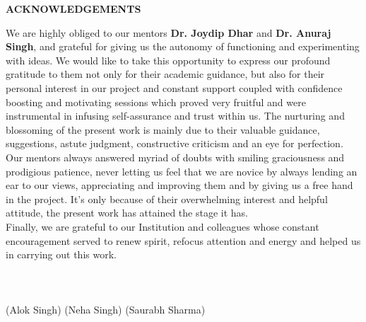 
\newpage
\begin{center}
{\large \bf ACKNOWLEDGEMENTS}
\end{center}
We are highly obliged to our mentors \textbf{Dr. Joydip Dhar} and \textbf{Dr. Anuraj Singh}, and grateful for giving us the autonomy of functioning and experimenting with ideas. We would like to take this opportunity to express our profound gratitude to them not only for  their academic guidance, but also for their personal interest in our project and constant support coupled with confidence boosting and  motivating sessions which proved very fruitful and were instrumental in infusing self-assurance and trust within us. The nurturing and blossoming of the present work is mainly due to their valuable guidance, suggestions, astute judgment, constructive criticism and an eye  for perfection. Our mentors always answered myriad of doubts with smiling graciousness and prodigious patience, never letting us feel  that we are novice by always lending an ear to our views, appreciating and improving them and by giving us a free hand in the project. It's only because of their overwhelming interest and helpful attitude, the present work has attained the stage it has.\\
Finally, we are grateful to our Institution and colleagues whose constant encouragement served to renew spirit, refocus attention  and energy and helped us in carrying out this work.\\ \\ \\ \\
(Alok Singh) \hspace{1in} (Neha Singh) \hspace{1in} (Saurabh Sharma)
